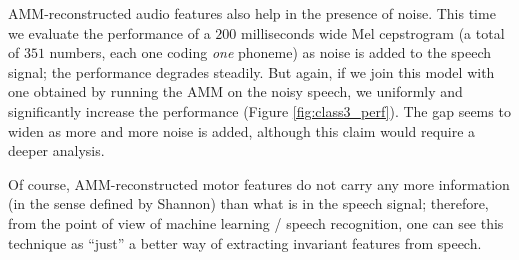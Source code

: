 AMM-reconstructed audio features also help in the presence of noise. This time
we evaluate the performance of a $200$ milliseconds wide Mel cepstrogram (a total
of $351$ numbers, each one coding \emph{one} phoneme) as noise is added to the
speech signal; the performance degrades steadily. But again, if we join this
model with one obtained by running the AMM on the noisy speech, we uniformly
and significantly increase the performance (Figure \ref{fig:class3_perf}). The
gap seems to widen as more and more noise is added, although this claim would
require a deeper analysis.

Of course, AMM-reconstructed motor features do not carry any more information
(in the sense defined by Shannon) than what is in the speech signal; therefore,
from the point of view of machine learning / speech recognition, one can see
this technique as ``just'' a better way of extracting invariant features from
speech.
